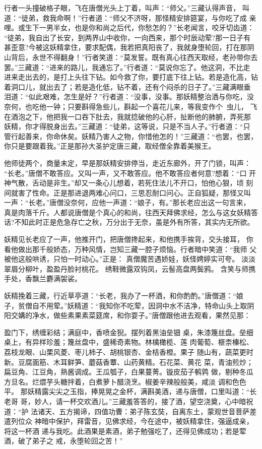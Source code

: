 行者一头撞破格子眼，飞在唐僧光头上丁着，叫声：“师父。”三藏认得声音，
叫道：“徒弟，救我命啊！”行者道：“师父不济呀，那怪精安排筵宴，与你吃了成
亲哩。或生下一男半女，也是你和尚之后代，你愁怎的？”长老闻言，咬牙切齿道：
“徒弟，我自出了长安，到两界山中收你，一向西来，那个时辰动荤?那一日子有
甚歪意?今被这妖精拿住，要求配偶，我若把真阳丧了，我就身堕轮回，打在那阴
山背后，永世不得翻身！”行者笑道：“莫发誓。既有真心往西天取经，老孙带你去
罢。”三藏道：“进来的路儿，我通忘了。”行者道：“莫说你忘了。他这洞，不比走
进来走出去的，是打上头往下钻。如今救了你，要打底下往上钻。若是造化高，钻
着洞口儿，就出去了；若是造化低，钻不着，还有个闷杀的日子了。”三藏满眼垂
泪道：“似此艰难，怎生是好？”行者道：“没事，没事。那妖精整治酒与你吃，没
奈何，也吃他一钟；只要斟得急些儿，斟起一个喜花儿来，等我变作个虫儿，
飞在酒泡之下，他把我一口吞下肚去，我就捻破他的心肝，扯断他的肺腑，弄死那
妖精，你才得脱身出去。”三藏道：“徒弟，这等说，只是不当人子。”行者道：“只
管行起善来，你命休矣。妖精乃害人之物，你惜他怎的！”三藏道：“也罢，也罢，
你只是要跟着我。”正是那孙大圣护定唐三藏，取经僧全靠着美猴王。

他师徒两个，商量未定，早是那妖精安排停当，走近东廊外，开了门锁，叫声：
“长老。”唐僧不敢答应。又叫一声，又不敢答应。他不敢答应者何意?想着：“口
开神气散，舌动是非生。”却又一条心儿想着，若死住法儿不开口，怕他心狠，顷
刻间就害了性命。正是那进退两难心问口，三思忍耐口问心。正自狐疑，那怪又叫
一声：“长老。”唐僧没奈何，应他一声道：“娘子，有。”那长老应出这一句言来，
真是肉落千斤。人都说唐僧是个真心的和尚，往西天拜佛求经，怎么与这女妖精答
话?不知此时正是危急存亡之秋，万分出于无奈，虽是外有所答，其实内无所欲。

妖精见长老应了一声，他推开门，把唐僧搀起来，和他携手挨背，交头接耳，
你看他做出那千般娇态，万种风情，岂知三藏一腔子烦恼。行者暗中笑道：“我师
父被他这般哄诱，只怕一时动心。”正是：
真僧魔苦遇娇娃，妖怪娉婷实可夸。
淡淡翠眉分柳叶，盈盈丹脸衬桃花。
绣鞋微露双钩凤，云髻高盘两鬓鸦。
含笑与师携手处，香飘兰麝满袈裟。

妖精挽着三藏，行近草亭道：“长老，我办了一杯酒，和你酌酌。”唐僧道：“娘
子，贫僧自不用荤。”妖精道：“我知你不吃荤，因洞中水不洁净，特命山头上取阴
阳交媾的净水，做些素果素菜筵席，和你耍子。”唐僧跟他进去观看，果然见那：

盈门下，绣缠彩结；满庭中，香喷金猊。摆列着黑油垒钿
桌，朱漆篾丝盘。垒细桌上，有异样珍羞；篾丝盘中，盛稀奇素物。林檎橄榄、莲
肉葡萄、榧柰榛松、荔枝龙眼、山栗风菱、枣儿柿子、胡桃银杏、金桔香橙。果子
随山有，蔬菜更时新。豆腐面筋、木耳鲜笋、蘑菇香蕈、山药黄精。石花菜、黄花
菜，青油煎炒；扁豆角、江豆角，熟酱调成。王瓜瓠子，白果蔓菁。镟皮茄子鹌鹑
做，剔种冬瓜方旦名。烂煨芋头糖拌着，白煮萝卜醋浇烹。椒姜辛辣般般美，咸淡
调和色色平。
那妖精露尖尖之玉指，捧晃晃之金杯，满斟美酒，递与唐僧，口里叫道：“长老哥
哥，妙人，请一杯交欢酒儿。”三藏羞答答的，接了酒，望空浇奠，心中暗祝道：“护
法诸天、五方揭谛，四值功曹：弟子陈玄奘，自离东土，蒙观世音菩萨差遣列位众
神暗中保护，拜雷音，见佛求经，今在途中，被妖精拿住，强逼成亲，将这一杯酒
递与我吃。此酒果是素酒，弟子勉强吃了，还得见佛成功；若是荤酒，破了弟子之
戒，永堕轮回之苦！”

